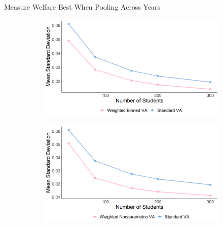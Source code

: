 \documentclass[t,aspectratio=169,11pt]{beamer}
\begin{document}
\begin{frame}{Measure Welfare Best When Pooling Across Years}
\vfill
\begin{figure}
\centering
\begin{subfigure}{.5\textwidth}
  \centering
  \includegraphics[width=\linewidth]{slides/CIERS_Figures/stress_bin_n_stud.png}
\end{subfigure}%
\begin{subfigure}{.5\textwidth}
  \centering
  \includegraphics[width=\linewidth]{slides/CIERS_Figures/stress_np_n_stud.png}
\end{subfigure}
\end{figure}
    
\end{frame}




\end{document}
